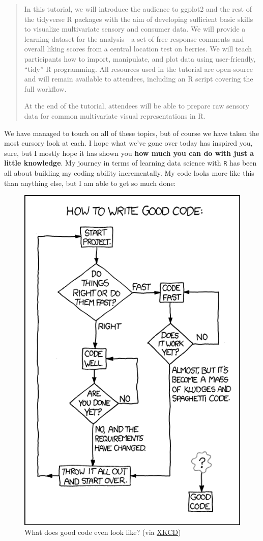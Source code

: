 \documentclass[
]{book}
\begin{document}
\begin{quote}
In this tutorial, we will introduce the audience to ggplot2 and the rest of the tidyverse R packages with the aim of developing sufficient basic skills to visualize multivariate sensory and consumer data. We will provide a learning dataset for the analysis---a set of free response comments and overall liking scores from a central location test on berries. We will teach participants how to import, manipulate, and plot data using user-friendly, ``tidy'' R programming. All resources used in the tutorial are open-source and will remain available to attendees, including an R script covering the full workflow.

At the end of the tutorial, attendees will be able to prepare raw sensory data for common multivariate visual representations in R.
\end{quote}

We have managed to touch on all of these topics, but of course we have taken the most cursory look at each. I hope what we've gone over today has inspired you, sure, but I mostly hope it has shown you \textbf{how much you can do with just a little knowledge}. My journey in terms of learning data science with \texttt{R} has been all about building my coding ability incrementally. My code looks more like this than anything else, but I am able to get so much done:

\begin{figure}
\centering
\includegraphics{img/xkcd_844_good_code.png}
\caption{What does good code even look like? (via \href{https://xkcd.com/844/}{XKCD})}
\end{figure}
\end{document}
